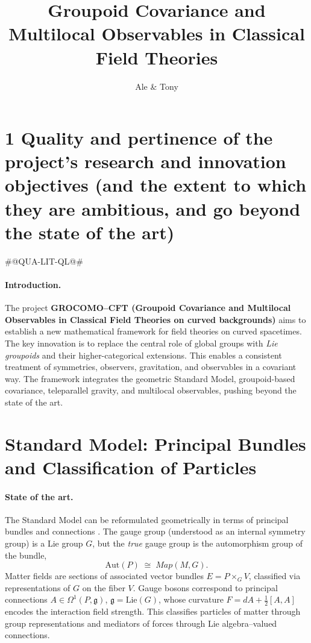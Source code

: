 \documentclass[11pt,a4paper]{article}
\title{Groupoid Covariance and Multilocal Observables in Classical Field Theories}
\author{Ale \& Tony}
\date{}
\begin{document}
\maketitle

\section*{1 \quad Quality and pertinence of the project’s research and innovation objectives (and the extent to which they are ambitious, and go beyond the state of the art)}
\label{sec:quality}
\#@QUA-LIT-QL@#

\paragraph{Introduction.}
The project \textbf{GROCOMO--CFT (Groupoid Covariance and Multilocal Observables in Classical Field Theories on curved backgrounds)} aims to establish a new mathematical framework for field theories on curved spacetimes. The key innovation is to replace the central role of global groups with \emph{Lie groupoids} and their higher-categorical extensions. This enables a consistent treatment of symmetries, observers, gravitation, and observables in a covariant way. The framework integrates the geometric Standard Model, groupoid-based covariance, teleparallel gravity, and multilocal observables, pushing beyond the state of the art.

\section{Standard Model: Principal Bundles and Classification of Particles}

\paragraph{State of the art.}
The Standard Model can be reformulated geometrically in terms of principal bundles and connections \cite{Bleeker,Hamilton}. The gauge group (understood as an internal symmetry group) is a Lie group $G$, but the \emph{true} gauge group is the automorphism group of the bundle, 
$$
\mathrm{Aut}(P) \;\cong\; Map(M,G).
$$
Matter fields are sections of associated vector bundles $E=P\times_G V$, classified via representations of $G$ on the fiber $V$. Gauge bosons correspond to principal connections $A\in \Omega^1(P,\mathfrak{g})$, $\mathfrak{g}=\mathrm{Lie}(G)$, whose curvature $F=dA+\tfrac{1}{2}[A,A]$ encodes the interaction field strength. This classifies particles of matter through group representations and mediators of forces through Lie algebra–valued connections.
\end{document}
